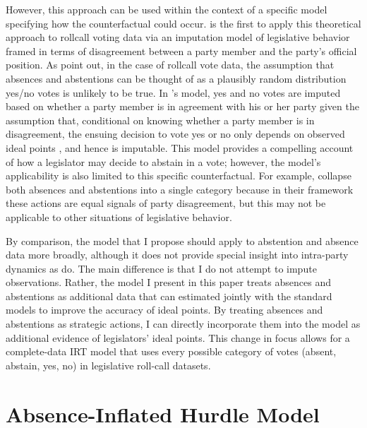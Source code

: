 	However, this approach can be used within the context of a specific model specifying how the counterfactual could occur. \textcite{rosas2015} is the first to apply this theoretical approach to rollcall voting data via an imputation model of legislative behavior framed in terms of disagreement between a party member and the party's official position.  As \textcite{rosas2015} point out, in the case of rollcall vote data, the assumption that absences and abstentions can be thought of as a plausibly random distribution yes/no votes is unlikely to be true. In \citeauthor{rosas2015}'s model, yes and no votes are imputed based on whether a party member is in agreement with his or her party given the assumption that, conditional on knowing whether a party member is in disagreement, the ensuing decision to vote yes or no only depends on observed ideal points \parencite{rubin2002}, and hence is imputable. This model provides a compelling account of how a legislator may decide to abstain in a vote; however, the model's applicability is also limited to this specific counterfactual. For example, \citeauthor{rosas2015} collapse both absences and abstentions into a single category because in their framework these actions are equal signals of party disagreement, but this may not be applicable to other situations of legislative behavior.
	
	By comparison, the model that I propose should apply to abstention and absence data more broadly, although it does not provide special insight into intra-party dynamics as \textcite{rosas2015} do. The main difference is that I do not attempt to impute observations. Rather, the model I present in this paper treats absences and abstentions as additional data that can estimated jointly with the standard models to improve the accuracy of ideal points. By treating absences and abstentions as strategic actions, I can directly incorporate them into the model as additional evidence of legislators' ideal points. This change in focus allows for a complete-data IRT model that uses every possible category of votes (absent, abstain, yes, no) in legislative roll-call datasets.
	
	
	
	\section*{Absence-Inflated Hurdle Model}
	

